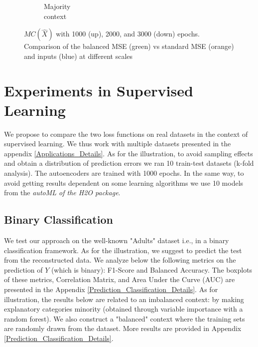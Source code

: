 \documentclass{article}
\def \w {\widehat}
\theoremstyle{definition}
\begin{document}
\begin{figure}[ht]
\begin{subfigure}[b]{0.15\textwidth}
         \caption{Majority \\ context}
         \label{Boxplots_Corr_Xhat_Majo}
     \end{subfigure}
     \caption{$MC(\w X)$ with 1000 (up), 2000, and 3000 (down) epochs. Comparison of the balanced MSE (green) vs standard MSE (orange) and inputs (blue) at different scales }
     \label{Boxplots_Corr_Xhat}
\end{figure}














\section{Experiments in Supervised Learning}
\label{XP_supervised}
We propose to compare the two loss functions on real datasets in the context of supervised learning. We thus work with multiple datasets presented in the appendix \ref{Applications_Details}. As for the illustration, to avoid sampling effects and obtain a distribution of prediction errors we ran 10 train-test datasets (k-fold analysis). The autoencoders are trained with 1000 epochs. %
In the same way, to avoid getting results dependent on some learning algorithms we use 10 models from the \textit{autoML of the H2O package}. 

\subsection{Binary Classification}
We test our approach on the well-known "Adults" dataset i.e., in a binary classification framework.   
As for the illustration, we suggest to predict the test from the reconstructed data. We analyze below the following metrics on the prediction of $Y$ (which is binary): F1-Score and Balanced Accuracy. The boxplots of these metrics, Correlation Matrix, and Area Under the Curve (AUC) are presented in the Appendix \ref{Prediction_Classification_Details}. As for illustration, the results below are related to an imbalanced context: by making explanatory categories minority (obtained through variable importance with a random forest). We also construct a "balanced" context where the training sets are randomly drawn from the dataset. More results are provided in Appendix \ref{Prediction_Classification_Details}.
\end{document}
